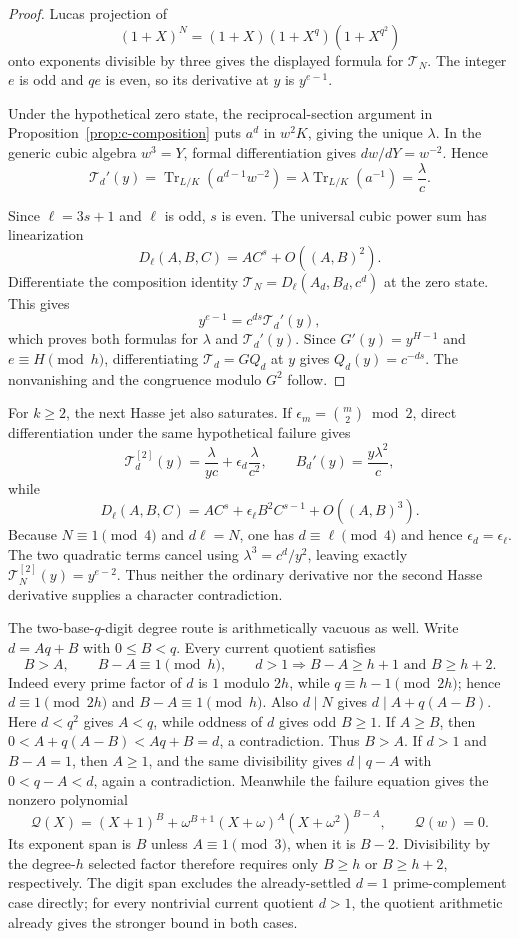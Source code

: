\documentclass[11pt]{article}
\theoremstyle{definition}
\theoremstyle{remark}
\begin{document}
\begin{proof}
Lucas projection of
\[
 (1+X)^N=(1+X)(1+X^q)(1+X^{q^2})
\]
onto exponents divisible by three gives the displayed formula for
$\mathcal T_N$.  The integer $e$ is odd and $qe$ is even, so its derivative
at $y$ is $y^{e-1}$.

Under the hypothetical zero state, the reciprocal-section argument in
Proposition~\ref{prop:c-composition} puts $a^d$ in $w^2K$, giving the unique
$\lambda$.  In the generic cubic algebra $w^3=Y$, formal differentiation
gives $dw/dY=w^{-2}$.  Hence
\[
 \mathcal T_d'(y)
 =\operatorname{Tr}_{L/K}(a^{d-1}w^{-2})
 =\lambda\operatorname{Tr}_{L/K}(a^{-1})
 =\frac{\lambda}{c}.
\]

Since $\ell=3s+1$ and $\ell$ is odd, $s$ is even.  The universal cubic
power sum has linearization
\[
 D_\ell(A,B,C)=AC^s+O((A,B)^2).
\]
Differentiate the composition identity
$\mathcal T_N=D_\ell(A_d,B_d,c^d)$ at the zero state.  This gives
\[
 y^{e-1}=c^{ds}\mathcal T_d'(y),
\]
which proves both formulas for $\lambda$ and $\mathcal T_d'(y)$.  Since
$G'(y)=y^{H-1}$ and $e\equiv H\pmod h$, differentiating
$\mathcal T_d=GQ_d$ at $y$ gives $Q_d(y)=c^{-ds}$.  The nonvanishing and
the congruence modulo $G^2$ follow.
\end{proof}

For $k\geq2$, the next Hasse jet also saturates.  If
$\epsilon_m=\binom m2\bmod2$, direct differentiation under the same
hypothetical failure gives
\[
 \mathcal T_d^{[2]}(y)=\frac{\lambda}{yc}
       +\epsilon_d\frac{\lambda}{c^2},
 \qquad B_d'(y)=\frac{y\lambda^2}{c},
\]
while
\[
 D_\ell(A,B,C)=AC^s+\epsilon_\ell B^2C^{s-1}
                 +O((A,B)^3).
\]
Because $N\equiv1\pmod4$ and $d\ell=N$, one has
$d\equiv\ell\pmod4$ and hence
$\epsilon_d=\epsilon_\ell$.  The two quadratic terms cancel using
$\lambda^3=c^d/y^2$, leaving exactly
$\mathcal T_N^{[2]}(y)=y^{e-2}$.  Thus neither the ordinary derivative nor
the second Hasse derivative supplies a character contradiction.

The two-base-$q$-digit degree route is arithmetically vacuous as well.  Write
$d=Aq+B$ with $0\leq B<q$.  Every current quotient satisfies
\[
 B>A,\qquad B-A\equiv1\pmod h,
 \qquad d>1\Longrightarrow B-A\geq h+1\text{ and }B\geq h+2.
\]
Indeed every prime factor of $d$ is $1$ modulo $2h$, while
$q\equiv h-1\pmod {2h}$; hence $d\equiv1\pmod {2h}$ and
$B-A\equiv1\pmod h$.  Also $d\mid N$ gives
$d\mid A+q(A-B)$.  Here $d<q^2$ gives $A<q$, while oddness of $d$ gives
odd $B\geq1$.  If $A\geq B$, then
$0<A+q(A-B)<Aq+B=d$, a contradiction.  Thus $B>A$.  If $d>1$ and
$B-A=1$, then $A\geq1$, and the same divisibility gives $d\mid q-A$ with
$0<q-A<d$, again a contradiction.  Meanwhile the failure
equation gives the nonzero polynomial
\[
 \mathcal Q(X)=(X+1)^B+
  \omega^{B+1}(X+\omega)^A(X+\omega^2)^{B-A},
 \qquad \mathcal Q(w)=0.
\]
Its exponent span is $B$ unless $A\equiv1\pmod3$, when it is $B-2$.
Divisibility by the degree-$h$ selected factor therefore requires only
$B\geq h$ or $B\geq h+2$, respectively.  The digit span excludes the
already-settled $d=1$ prime-complement case directly; for every nontrivial
current quotient $d>1$, the quotient arithmetic already gives the stronger
bound in both cases.
\end{document}
